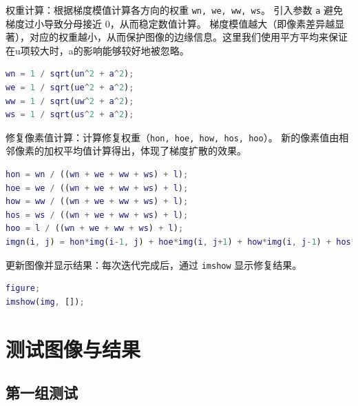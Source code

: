 \documentclass[UTF8]{ctexart}
\begin{document}
权重计算：根据梯度模值计算各方向的权重 \texttt{wn, we, ww, ws}。
引入参数 \texttt{a} 避免梯度过小导致分母接近 0，从而稳定数值计算。
梯度模值越大（即像素差异越显著），对应的权重越小，从而保护图像的边缘信息。这里我们使用平方平均来保证在u项较大时，a的影响能够较好地被忽略。
\begin{lstlisting}[language=Matlab]
wn = 1 / sqrt(un^2 + a^2);
we = 1 / sqrt(ue^2 + a^2);
ww = 1 / sqrt(uw^2 + a^2);
ws = 1 / sqrt(us^2 + a^2);
\end{lstlisting}

修复像素值计算：计算修复权重（\texttt{hon, hoe, how, hos, hoo}）。
新的像素值由相邻像素的加权平均值计算得出，体现了梯度扩散的效果。
\begin{lstlisting}[language=Matlab]
hon = wn / ((wn + we + ww + ws) + l);
hoe = we / ((wn + we + ww + ws) + l);
how = ww / ((wn + we + ww + ws) + l);
hos = ws / ((wn + we + ww + ws) + l);
hoo = l / ((wn + we + ww + ws) + l);
imgn(i, j) = hon*img(i-1, j) + hoe*img(i, j+1) + how*img(i, j-1) + hos*img(i+1, j) + hoo*img(i, j);
\end{lstlisting}

更新图像并显示结果：每次迭代完成后，通过 \texttt{imshow} 显示修复结果。
\begin{lstlisting}[language=Matlab]
figure;
imshow(img, []);
\end{lstlisting}

\section{测试图像与结果}

\subsection{第一组测试}
\end{document}
